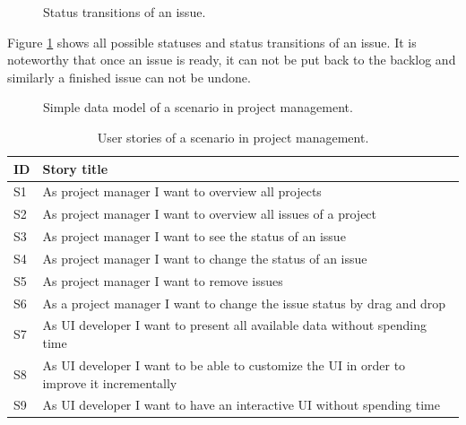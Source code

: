 \begin{figure}[!htb]
  \caption{Status transitions of an issue.}
  \label{fig:statetransition}
\end{figure}

Figure \ref{fig:statetransition} shows all possible statuses and status transitions of an issue. It is noteworthy that once an issue is ready, it can not be put back to the backlog and similarly a finished issue can not be undone.

\begin{figure}[!htb]
  \caption{Simple data model of a scenario in project management.}
\end{figure}

\begin{table}
  \begin{center}
    \begin{tabular}{ |l|l| }
      \hline
      \textbf{ID} & \textbf{Story title} \\
      \hline
      S1 & As project manager I want to overview all projects \\
      \hline
      S2 & As project manager I want to overview all issues of a project \\
      \hline
      S3 & As project manager I want to see the status of an issue \\
      \hline
      S4 & As project manager I want to change the status of an issue \\
      \hline
      S5 & As project manager I want to remove issues \\
      \hline
      S6 & As a project manager I want to change the issue status by drag and drop \\
      \hline
      S7 & As UI developer I want to present all available data without spending time \\
      \hline
      S8 & As UI developer I want to be able to customize the UI in order to improve it incrementally \\
      \hline
      S9 & As UI developer I want to have an interactive UI without spending time \\
      \hline
    \end{tabular}
    \caption{User stories of a scenario in project management.}
    \label{tab:usecase2}
  \end{center}
\end{table}

